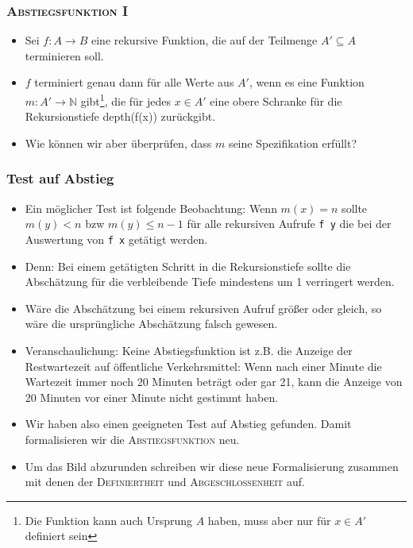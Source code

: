 \documentclass{beamer}
\begin{document}
\begin{frame}
  \frametitle{\textsc{Abstiegsfunktion I}}
  \begin{itemize}
  \item Sei \(f:A\to B \) eine rekursive Funktion, die auf der Teilmenge \(A'\subseteq A\) terminieren soll. 
  \item \(f\) terminiert genau dann für alle Werte aus \(A'\), wenn es eine Funktion \(m:A'\to \mathbb{N}\) gibt\footnote{Die Funktion kann auch Ursprung \(A\) haben, muss aber nur für \(x\in A'\) definiert sein}, die für jedes \(x\in A'\) eine obere Schranke für die Rekursionstiefe depth(f(x)) zurückgibt.
  \item Wie können wir aber überprüfen, dass \(m\) seine Spezifikation erfüllt?
  \end{itemize}
\end{frame}
\begin{frame}
  \frametitle{Test auf Abstieg}
  \begin{itemize}
  \item  Ein möglicher Test ist folgende Beobachtung: Wenn \(m(x) = n\) sollte \(m(y) < n\) bzw \(m(y) \leq n-1\) für alle rekursiven Aufrufe \texttt{f y} die bei der Auswertung von \texttt{f x} getätigt werden.
  \item Denn: Bei einem getätigten Schritt in die Rekursionstiefe sollte die Abschätzung für die verbleibende Tiefe mindestens um 1 verringert werden.
  \item Wäre die Abschätzung bei einem rekursiven Aufruf größer oder gleich, so wäre die ursprüngliche Abschätzung falsch gewesen.
  \item Veranschaulichung: Keine Abstiegsfunktion ist z.B. die Anzeige der Restwartezeit auf öffentliche Verkehrsmittel: Wenn nach einer Minute die Wartezeit immer noch 20 Minuten beträgt oder gar 21, kann die Anzeige von 20 Minuten vor einer Minute nicht gestimmt haben.
  \end{itemize}
\end{frame}
\begin{frame}
  \begin{itemize}
  \item Wir haben also einen geeigneten Test auf Abstieg gefunden. Damit formalisieren wir die \textsc{Abstiegsfunktion} neu.
  \item Um das Bild abzurunden schreiben wir diese neue Formalisierung zusammen mit denen der \textsc{Definiertheit} und \textsc{Abgeschlossenheit} auf.
  \end{itemize}
\end{frame}
\end{document}
